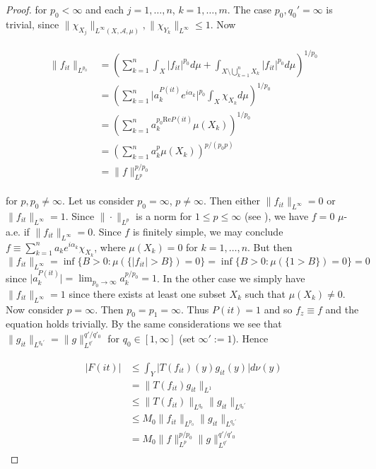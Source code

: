 \begin{proof}
				for $p_0 < \infty$ and each $j = 1,\hdots,n$, $k = 1,\hdots,m$. The case $p_0,q_0' = \infty$ is trivial, since $\|\chi_{X_j}\|_{L^\infty(X,\mathcal{A},\mu)},\|\chi_{Y_k}\|_{L^\infty} \leqslant 1$. Now

				\begin{gather}
					\begin{aligned}
						\|f_{it}\|_{L^{p_0}} &= \left(\sum_{k = 1}^n \int_X \vert f_{it} \vert^{p_0} d\mu + \int_{X \setminus \bigcup_{k = 1}^n X_k} \vert f_{it} \vert^{p_0} d\mu\right)^{1/p_0}\\
						&= \left(\sum_{k = 1}^n \vert a_k^{P(it)} e^{i\alpha_k}\vert^{p_0}\int_X \chi_{X_k} d\mu\right)^{1/p_0}\\
						&= \left(\sum_{k = 1}^n a_k^{p_0\mathrm{Re}P(it)}\mu(X_k)\right)^{1/p_0}\\
						&= \left(\sum_{k = 1}^n a_{k}^p\mu(X_k)\right)^{p/(p_0p)}\\
						&= \|f\|_{L^p}^{p/p_0} 
					\end{aligned}
				\end{gather}

				for $p,p_0 \neq \infty$. Let us consider $p_0 = \infty$, $p \neq \infty$. Then either $\|f_{it}\|_{L^{\infty}} = 0$ or $\|f_{it}\|_{L^{\infty}} = 1$. Since $\|\cdot\|_{L^p}$ is a norm for $1 \leqslant p \leqslant \infty$ (see \cite[231]{elstrodt:mass:2011}), we have $f = 0$ $\mu$-a.e. if $\|f_{it}\|_{L^{\infty}} = 0$. Since $f$ is finitely simple, we may conclude $f \equiv \sum_{k = 1}^n a_k e^{i\alpha_k}\chi_{X_k}$, where $\mu(X_k) = 0$ for $k = 1,\hdots,n$. But then $\|f_{it}\|_{L^{\infty}} = \inf\{B > 0 : \mu(\{\vert f_{it} \vert > B\}) = 0\} =  \inf\{B > 0 : \mu(\{1 > B\}) = 0\}= 0$ since $\vert a_k^{P(it)}\vert = \lim_{p_0 \rightarrow \infty} a_k^{p/p_0} = 1$. In the other case we simply have $\|f_{it}\|_{L^{\infty}} = 1$ since there exists at least one subset $X_k$ such that $\mu(X_k) \neq 0$. Now consider $p = \infty$. Then $p_0 = p_1 = \infty$. Thus $P(it) = 1$ and so $f_z \equiv f$ and the equation holds trivially. By the same considerations we see that $\|g_{it}\|_{L^{q_0'}} = \|g\|_{L^{q'}}^{q'/q'_0}$ for $q_0 \in [1,\infty]$ (set $\infty' := 1 $). Hence

				\begin{gather}
					\begin{aligned}
						\vert F(it) \vert &\leqslant \int_Y \vert T(f_{it})(y)g_{it}(y)\vert d\nu(y)\\
						&= \|T(f_{it}) g_{it}\|_{L^1}\\
						&\leqslant \|T(f_{it})\|_{L^{q_0}}\|g_{it}\|_{L^{q_0'}}\\
						&\leqslant M_0 \|f_{it}\|_{L^{p_0}} \|g_{it}\|_{L^{q_0'}}\\
						&= M_0  \|f\|_{L^p}^{p/p_0} \|g\|_{L^{q'}}^{q'/q'_0}
					\end{aligned}
				\end{gather}


\end{proof}
